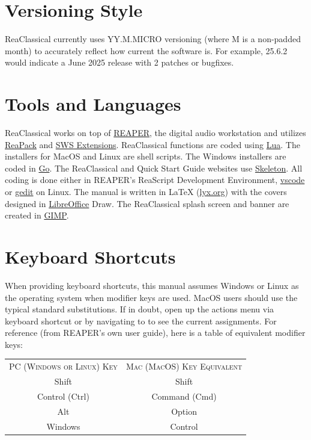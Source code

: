 \documentclass[10pt,american]{article}
\begin{document}
\section{Versioning Style}

ReaClassical currently uses YY.M.MICRO versioning (where M is a non-padded
month) to accurately reflect how current the software is. For example, 25.6.2
would indicate a June 2025 release with 2 patches or bugfixes. 

\section{Tools and Languages}

ReaClassical works on top of \href{https://www.reaper.fm/}{REAPER}, the digital
audio workstation and utilizes \href{https://reapack.com/}{ReaPack} and
\href{https://www.sws-extension.org/index.php}{SWS Extensions}. ReaClassical
functions are coded using \href{https://www.lua.org/}{Lua}. The installers for
MacOS and Linux are shell scripts. The Windows installers are coded in
\href{https://go.dev/}{Go}. The ReaClassical and Quick Start Guide websites use
\href{http://getskeleton.com/}{Skeleton}. All coding is done either in REAPER's
ReaScript Development Environment, \href{https://code.visualstudio.com/}{vscode}
or \href{https://gedit-technology.github.io/apps/gedit/}{gedit} on Linux. The
manual is written in \LaTeX{} (\href{https://www.lyx.org/}{lyx.org}) with the
covers designed in \href{https://www.libreoffice.org/}{LibreOffice} Draw. The
ReaClassical splash screen and banner are created in
\href{https://www.gimp.org/}{GIMP}.

\section{Keyboard Shortcuts}

When providing keyboard shortcuts, this manual assumes Windows or Linux as the
operating system when modifier keys are used. MacOS users should use the typical
standard substitutions. If in doubt, open up the actions menu via keyboard
shortcut  or by navigating to  to
see the current assignments. For reference (from REAPER's own user guide), here
is a table of equivalent modifier keys:
\begin{center}
\begin{tabular}{cc}
\toprule 
\addlinespace
\textsc{PC (Windows or Linux) Key} & \textsc{Mac (MacOS) Key
Equivalent}\tabularnewline\addlinespace
\midrule
\addlinespace
\midrule 
Shift & Shift\tabularnewline
\midrule 
Control (Ctrl) & Command (Cmd)\tabularnewline
\midrule 
Alt & Option\tabularnewline
\midrule 
Windows & Control\tabularnewline
\bottomrule
\end{tabular}
\par\end{center}
\end{document}
